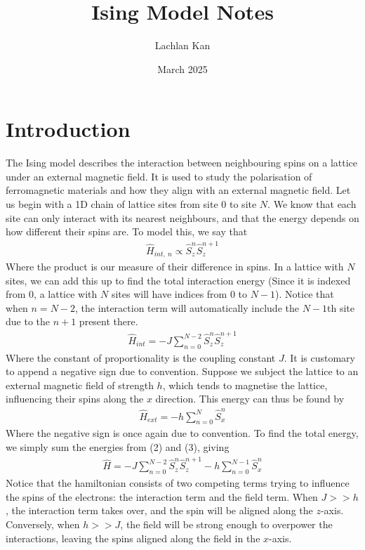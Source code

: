 \documentclass{article}
\title{Ising Model Notes}
\author{Lachlan Kan}
\date{March 2025}
\begin{document}
\maketitle
\section{Introduction}
The Ising model describes the interaction between neighbouring spins on a lattice
under an external magnetic field. It is used to study the polarisation of ferromagnetic 
materials and how they align with an external magnetic field. Let us begin with 
a 1D chain of lattice sites from site 0 to site $N$. We know that each site can only interact with its nearest neighbours, and that 
the energy depends on how different their spins are. To model this, we say that 
\begin{align}
    \hat{H}_{int,\ n}\propto\hat{S}_z^n \hat{S}_z^{n+1}
\end{align}
Where the product is our measure of their difference in spins.
 In a lattice with $N$ sites, we can add this up to find 
the total interaction energy (Since it is indexed from 0, a lattice with $N$ sites 
will have indices from $0$ to $N-1$). 
Notice that when $n=N-2$, the interaction term will automatically include the $N-1$th site due to 
the $n+1$ present there. 
\begin{align}
    \hat{H}_{int}=-J\sum_{n=0}^{N-2}\hat{S}_z^n \hat{S}_z^{n+1}
\end{align}
Where the constant of proportionality is the coupling constant $J$. It is customary to append a negative sign due to convention. 
Suppose we subject the lattice to an external magnetic field of strength $h$, which tends to 
magnetise the lattice, influencing their spins along the $x$ direction. This energy can thus be 
found by 
\begin{align}
    \hat{H}_{ext}=-h\sum_{n=0}^N\hat{S}_x^n
\end{align}
Where the negative sign is once again due to convention. 
To find the total energy, we simply sum the energies from (2) and (3), giving 
\begin{align}
    \hat{H}=-J\sum_{n=0}^{N-2}\hat{S}_z^n \hat{S}_z^{n+1}-h\sum_{n=0}^{N-1}\hat{S}_x^n
\end{align}
Notice that the hamiltonian consists of two competing terms trying to influence the spins of the electrons: the interaction term and the field term. 
When $J>>h$, the interaction term takes over, 
and the spin will be aligned along the $z$-axis. Conversely, when 
$h>>J$, the field will be strong enough to overpower the interactions, 
leaving the spins aligned 
along the field in the $x$-axis. 
\end{document}
